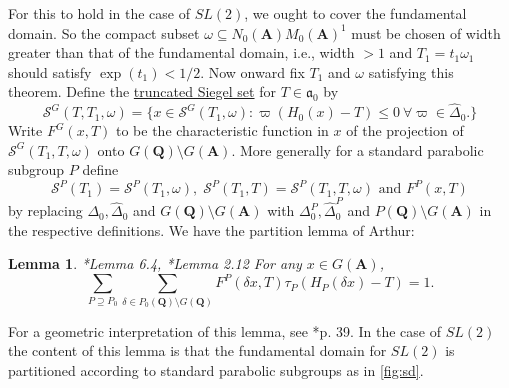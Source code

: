 \documentclass[11pt]{amsart}
\def\A{\mathbf A}
\def\Q{\mathbf Q}
\def\SSS{\mathcal S}
\def\aaa{\mathfrak a}
\def\bs{\setminus}
\newtheorem{lemma}[theorem]{Lemma}
\theoremstyle{remark}
\begin{document}
For this to hold in the case of $SL(2)$, we ought to cover the fundamental domain. So the compact subset $\omega \subseteq N_0(\A) M_0(\A)^1$ must be chosen of width greater than that of the fundamental domain, i.e., width $> 1$ and $T_1 = t_1 \omega_1$ should satisfy $\exp(t_1) < 1/2$. Now onward fix $T_1$ and $\omega$ satisfying this theorem. Define the \underline{truncated Siegel set} for $T \in \aaa_0$ by
\[ \SSS^G(T, T_1, \omega) = \{ x \in \SSS^G(T_1, \omega) : \varpi(H_0(x) - T) \leq 0 \ \forall \varpi \in \hat\Delta_0. \} \]
Write $F^G(x, T)$ to be the characteristic function in $x$ of the projection of $\SSS^G(T_1, T, \omega)$ onto $G(\Q)\bs G(\A)$. More generally for a standard parabolic subgroup $P$ define 
\[ \SSS^P(T_1) = \SSS^P(T_1, \omega), \; \SSS^P(T_1, T) = \SSS^P(T_1, T, \omega) \text{ and } F^P(x, T) \]
by replacing $\Delta_0, \hat\Delta_0$ and $G(\Q)\bs G(\A)$ with $\Delta_0^P, \hat \Delta_0^P$ and $P(\Q)\bs G(\A)$ in the respective definitions. We have the partition lemma of Arthur:
\begin{lemma} \label{partition_lemma} \cite{duke}*{Lemma 6.4}, \cite{MR0579181}*{Lemma 2.12}
	For any $x \in G(\A)$, 
	\[ \sum_{P \supseteq P_0} \sum_{\delta \in P_0(\Q) \bs G(\Q)} F^P(\delta x, T) \tau_P(H_P(\delta x) - T) = 1. \]
\end{lemma}
For a geometric interpretation of this lemma, see \cite{clay}*{p. 39}. In the case of $SL(2)$ the content of this lemma is that the fundamental domain for $SL(2)$ is partitioned according to standard parabolic subgroups as in \cref{fig:sd}.
\end{document}
